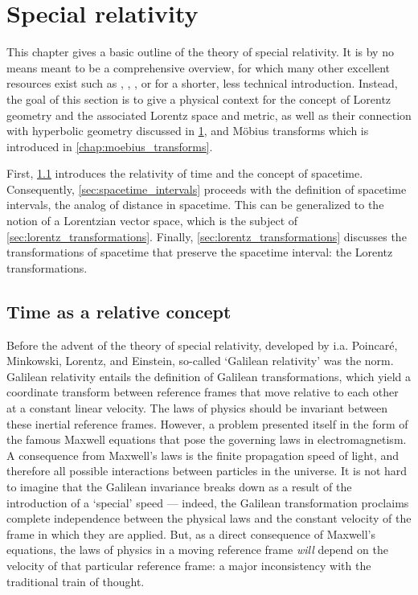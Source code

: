 \chapter{Special relativity}
\label{chap:relativity}
This chapter gives a basic outline of the theory of special relativity. It is by no means meant to be a comprehensive overview, for which many other excellent resources exist such as \citet{Misner1970}, \citet{Taylor1992}, \citet{Landau1971}, or \citet{Penrose1978} for a shorter, less technical introduction. Instead, the goal of this section is to give a physical context for the concept of Lorentz geometry and the associated Lorentz space and metric, as well as their connection with hyperbolic geometry discussed in \cref{chap:relativity}, and Möbius transforms which is introduced in \cref{chap:moebius_transforms}.

First, \cref{sec:time_relative} introduces the relativity of time and the concept of spacetime. Consequently, \cref{sec:spacetime_intervals} proceeds with the definition of spacetime intervals, the analog of distance in spacetime. This can be generalized to the notion of a Lorentzian vector space, which is the subject of \cref{sec:lorentz_transformations}. Finally, \cref{sec:lorentz_transformations} discusses the transformations of spacetime that preserve the spacetime interval: the Lorentz transformations.

\section{Time as a relative concept}
\label{sec:time_relative}
Before the advent of the theory of special relativity, developed by i.a. Poincaré, Minkowski, Lorentz, and Einstein, so-called `Galilean relativity' was the norm. Galilean relativity entails the definition of Galilean transformations, which yield a coordinate transform between reference frames that move relative to each other at a constant linear velocity. The laws of physics should be invariant between these inertial reference frames. However, a problem presented itself in the form of the famous Maxwell equations that pose the governing laws in electromagnetism. A consequence from Maxwell's laws is the finite propagation speed of light, and therefore all possible interactions between particles in the universe. It is not hard to imagine that the Galilean invariance breaks down as a result of the introduction of a `special' speed --- indeed, the Galilean transformation proclaims complete independence between the physical laws and the constant velocity of the frame in which they are applied. But, as a direct consequence of Maxwell's equations, the laws of physics in a moving reference frame \emph{will} depend on the velocity of that particular reference frame: a major inconsistency with the traditional train of thought.

